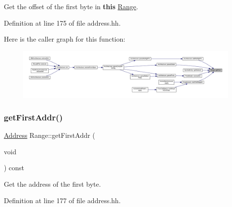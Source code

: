Get the offset of the first byte in {\bfseries{this}} \mbox{\hyperlink{class_range}{Range}}. 



Definition at line 175 of file address.\+hh.

Here is the caller graph for this function\+:
\nopagebreak
\begin{figure}[H]
\begin{center}
\leavevmode
\includegraphics[width=350pt]{class_range_a40c5034428ad9d55e1c4fd4429d3ab45_icgraph}
\end{center}
\end{figure}
\mbox{\label{class_range_abdedc039293f93e7687ecb43a21cdf38}} 
\subsubsection{\texorpdfstring{getFirstAddr()}{getFirstAddr()}}
{\footnotesize\ttfamily \mbox{\hyperlink{class_address}{Address}} Range\+::get\+First\+Addr (\begin{DoxyParamCaption}\item[{void}]{ }\end{DoxyParamCaption}) const\hspace{0.3cm}{\ttfamily [inline]}}



Get the address of the first byte. 



Definition at line 177 of file address.\+hh.

